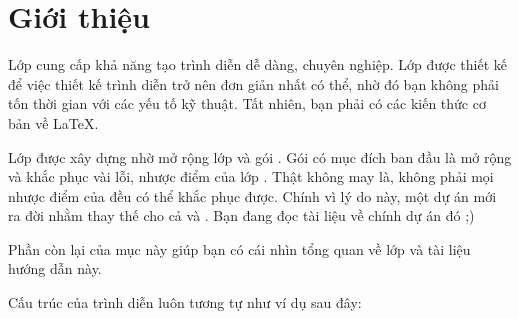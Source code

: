 
\section{\texorpdfstring{Giới thiệu}{Gioi thieu}}
\label{sec:intro}

Lớp  cung cấp khả năng tạo trình diễn dễ dàng, chuyên nghiệp.
Lớp được thiết kế để việc thiết kế trình diễn trở nên đơn giản nhất có thể,
nhờ đó bạn không phải tốn thời gian với các yếu tố kỹ thuật.
Tất nhiên, bạn phải có các kiến thức cơ bản về \LaTeX{}.

Lớp được xây dựng nhờ mở rộng lớp  \cite{prosper}
và gói  \cite{HA-prosper}. Gói 
có mục đích ban đầu là mở rộng và khắc phục vài lỗi, nhược điểm của lớp
. Thật không may là, không phải mọi nhược điểm của 
đều có thể khắc phục được. Chính vì lý do này, một dự án mới ra đời
nhằm thay thế cho cả  và .
Bạn đang đọc tài liệu về chính dự án đó ;)

Phần còn lại của mục này giúp bạn có cái nhìn tổng quan về lớp 
và tài liệu hướng dẫn này.

Cấu trúc của trình diễn luôn tương tự như ví dụ sau đây:

